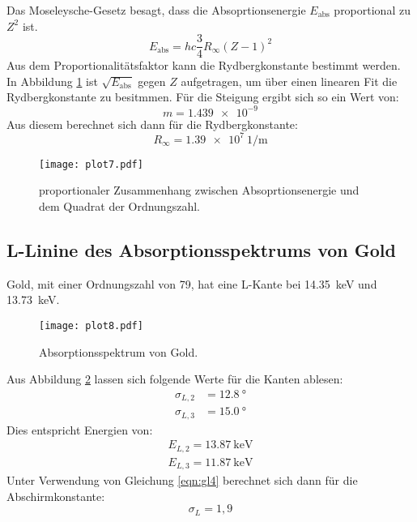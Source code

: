 Das Moseleysche-Gesetz besagt, dass die Absoprtionsenergie $E_\text{abs}$ proportional zu $Z^2$ ist.
\begin{equation}
  E_\text{abs} = h c \frac{3}{4} R_\infty (Z-1)^2
\end{equation}
Aus dem Proportionalitätsfaktor kann die Rydbergkonstante bestimmt werden.
In Abbildung \ref{fig:plot7} ist $\sqrt{E_\text{abs}}$ gegen $Z$ aufgetragen, um über einen linearen Fit die Rydbergkonstante zu besitmmen.
Für die Steigung ergibt sich so ein Wert von:
\begin{equation*}
  m = \num{1.439e-9}
\end{equation*}
Aus diesem berechnet sich dann für die Rydbergkonstante:
\begin{equation*}
  R_\infty = \SI{1.39e7}{1\per\meter}
\end{equation*}
\begin{figure}
  \centering
  \texttt{[image: plot7.pdf]}
  \caption{proportionaler Zusammenhang zwischen Absoprtionsenergie und dem Quadrat der Ordnungszahl.}
  \label{fig:plot7}
\end{figure}
\FloatBarrier

\subsection{L-Linine des Absorptionsspektrums von Gold}

Gold, mit einer Ordnungszahl von 79, hat eine L-Kante bei \SI{14.35}{\kilo\eV} und \SI{13.73}{\kilo\eV}.
\begin{figure}
  \centering
  \texttt{[image: plot8.pdf]}
  \caption{Absorptionsspektrum von Gold.}
  \label{fig:plot8}
\end{figure}
Aus Abbildung \ref{fig:plot8} lassen sich folgende Werte für die Kanten ablesen:
\begin{align*}
  \sigma_{L,2} &= \SI{12.8}{\degree}\\
  \sigma_{L,3} &= \SI{15.0}{\degree}
\end{align*}
Dies entspricht Energien von:
\begin{align*}
  E_{L,2} = \SI{13.87}{\kilo\eV} \\
  E_{L,3} = \SI{11,87}{\kilo\eV}
\end{align*}
Unter Verwendung von Gleichung \eqref{eqn:gl4} berechnet sich dann für die Abschirmkonstante:
\begin{equation*}
  \sigma_L = 1,9
\end{equation*}
